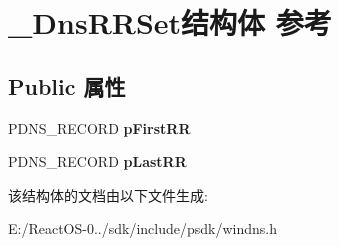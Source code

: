 \hypertarget{struct___dns_r_r_set}{}\section{\+\_\+\+Dns\+R\+R\+Set结构体 参考}
\label{struct___dns_r_r_set}
\subsection*{Public 属性}
\begin{DoxyCompactItemize}
\item 
\mbox{\label{struct___dns_r_r_set_af52c352c585076998bc1e25a37c81a24}} 
P\+D\+N\+S\+\_\+\+R\+E\+C\+O\+RD {\bfseries p\+First\+RR}
\item 
\mbox{\label{struct___dns_r_r_set_a2eb7fce55391f633d89ff3c220a51b1b}} 
P\+D\+N\+S\+\_\+\+R\+E\+C\+O\+RD {\bfseries p\+Last\+RR}
\end{DoxyCompactItemize}


该结构体的文档由以下文件生成\+:\begin{DoxyCompactItemize}
\item 
E\+:/\+React\+O\+S-\/0../sdk/include/psdk/windns.\+h\end{DoxyCompactItemize}
